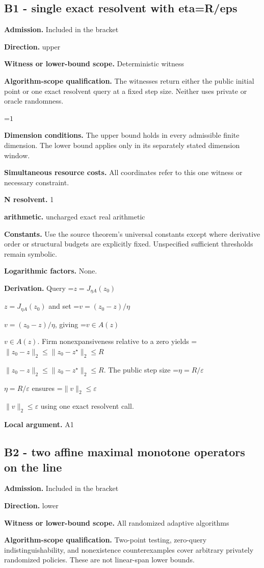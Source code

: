 \documentclass[10pt,a4paper]{article}
\newcommand{\AtlasMath}[1]{\par\begingroup\centering\setbox0=\hbox{$\displaystyle #1$}\ifdim\wd0>1.4\linewidth\typeout{ATLAS WIDE FORMULA: \the\wd0}\fi\ifdim\wd0>\linewidth\resizebox{\linewidth}{!}{\box0}\else\box0\fi\par\endgroup}
\newcommand{\AtlasInlineMath}[1]{\begingroup\setbox0=\hbox{$#1$}\ifdim\wd0>.4\linewidth\endgroup\AtlasMath{#1}\else\endgroup$#1$\fi}
\begin{document}
\subsection{B1 - single exact resolvent with eta=R/eps}
\textbf{Admission.} Included in the bracket

\textbf{Direction.} upper

\textbf{Witness or lower-bound scope.} Deterministic witness

\textbf{Algorithm-scope qualification.} The witnesses return either the public initial point or one exact resolvent query at a fixed step size. Neither uses private or oracle randomness.

\AtlasMath{1}
\textbf{Dimension conditions.} The upper bound holds in every admissible finite dimension. The lower bound applies only in its separately stated dimension window.

\textbf{Simultaneous resource costs.} All coordinates refer to this one witness or necessary constraint.

\textbf{N resolvent.} 1

\textbf{arithmetic.} uncharged exact real arithmetic

\textbf{Constants.} Use the source theorem’s universal constants except where derivative order or structural budgets are explicitly fixed. Unspecified sufficient thresholds remain symbolic.

\textbf{Logarithmic factors.} None.

\textbf{Derivation.} Query \AtlasInlineMath{z=J_{\eta A}(z_0)} and set \AtlasInlineMath{v=(z_0-z)/\eta}, giving \AtlasInlineMath{v\in A(z)}. Firm nonexpansiveness relative to a zero yields \AtlasInlineMath{\|z_0-z\|_2\le\|z_0-z^\star\|_2\le R}. The public step size \AtlasInlineMath{\eta=R/\varepsilon} ensures \AtlasInlineMath{\|v\|_2\le\varepsilon} using one exact resolvent call.

\textbf{Local argument.} A1

\subsection{B2 - two affine maximal monotone operators on the line}
\textbf{Admission.} Included in the bracket

\textbf{Direction.} lower

\textbf{Witness or lower-bound scope.} All randomized adaptive algorithms

\textbf{Algorithm-scope qualification.} Two-point testing, zero-query indistinguishability, and nonexistence counterexamples cover arbitrary privately randomized policies. These are not linear-span lower bounds.
\end{document}
